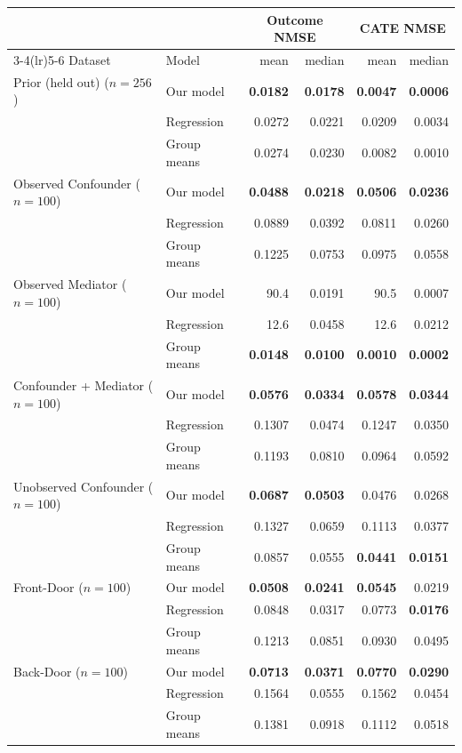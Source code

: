 \begin{tabular}{llrrrr}
\toprule
 & & \multicolumn{2}{c}{Outcome NMSE} & \multicolumn{2}{c}{CATE NMSE} \\
\cmidrule(lr){3-4}\cmidrule(lr){5-6}
Dataset & Model & mean & median & mean & median \\
\midrule
Prior (held out) ($n=256$) & Our model & \textbf{0.0182} & \textbf{0.0178} & \textbf{0.0047} & \textbf{0.0006} \\
 & Regression & 0.0272 & 0.0221 & 0.0209 & 0.0034 \\
 & Group means & 0.0274 & 0.0230 & 0.0082 & 0.0010 \\
\midrule
Observed Confounder ($n=100$) & Our model & \textbf{0.0488} & \textbf{0.0218} & \textbf{0.0506} & \textbf{0.0236} \\
 & Regression & 0.0889 & 0.0392 & 0.0811 & 0.0260 \\
 & Group means & 0.1225 & 0.0753 & 0.0975 & 0.0558 \\
\midrule
Observed Mediator ($n=100$) & Our model & 90.4 & 0.0191 & 90.5 & 0.0007 \\
 & Regression & 12.6 & 0.0458 & 12.6 & 0.0212 \\
 & Group means & \textbf{0.0148} & \textbf{0.0100} & \textbf{0.0010} & \textbf{0.0002} \\
\midrule
Confounder + Mediator ($n=100$) & Our model & \textbf{0.0576} & \textbf{0.0334} & \textbf{0.0578} & \textbf{0.0344} \\
 & Regression & 0.1307 & 0.0474 & 0.1247 & 0.0350 \\
 & Group means & 0.1193 & 0.0810 & 0.0964 & 0.0592 \\
\midrule
Unobserved Confounder ($n=100$) & Our model & \textbf{0.0687} & \textbf{0.0503} & 0.0476 & 0.0268 \\
 & Regression & 0.1327 & 0.0659 & 0.1113 & 0.0377 \\
 & Group means & 0.0857 & 0.0555 & \textbf{0.0441} & \textbf{0.0151} \\
\midrule
Front-Door ($n=100$) & Our model & \textbf{0.0508} & \textbf{0.0241} & \textbf{0.0545} & 0.0219 \\
 & Regression & 0.0848 & 0.0317 & 0.0773 & \textbf{0.0176} \\
 & Group means & 0.1213 & 0.0851 & 0.0930 & 0.0495 \\
\midrule
Back-Door ($n=100$) & Our model & \textbf{0.0713} & \textbf{0.0371} & \textbf{0.0770} & \textbf{0.0290} \\
 & Regression & 0.1564 & 0.0555 & 0.1562 & 0.0454 \\
 & Group means & 0.1381 & 0.0918 & 0.1112 & 0.0518 \\
\bottomrule
\end{tabular}
